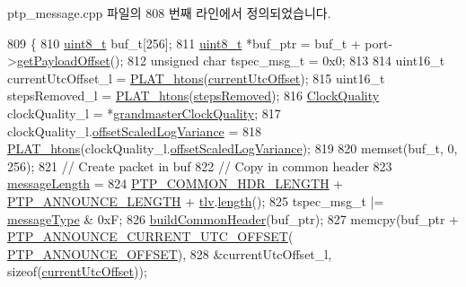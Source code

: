 ptp\+\_\+message.\+cpp 파일의 808 번째 라인에서 정의되었습니다.


\begin{DoxyCode}
809 \{
810     \hyperlink{stdint_8h_aba7bc1797add20fe3efdf37ced1182c5}{uint8\_t} buf\_t[256];
811     \hyperlink{stdint_8h_aba7bc1797add20fe3efdf37ced1182c5}{uint8\_t} *buf\_ptr = buf\_t + port->\hyperlink{class_common_port_a2697fd0fc7139659877b76cd1b022d44}{getPayloadOffset}();
812     \textcolor{keywordtype}{unsigned} \textcolor{keywordtype}{char} tspec\_msg\_t = 0x0;
813 
814     uint16\_t currentUtcOffset\_l = \hyperlink{linux_2src_2platform_8cpp_aa89fc0aa7465274c200da69771d2a043}{PLAT\_htons}(\hyperlink{class_p_t_p_message_announce_a4ee8eca04b1ccd7d8eaae5f0dd3a11fa}{currentUtcOffset});
815     uint16\_t stepsRemoved\_l = \hyperlink{linux_2src_2platform_8cpp_aa89fc0aa7465274c200da69771d2a043}{PLAT\_htons}(\hyperlink{class_p_t_p_message_announce_ab24df4cccbede4b07586878ef0d47395}{stepsRemoved});
816     \hyperlink{struct_clock_quality}{ClockQuality} clockQuality\_l = *\hyperlink{class_p_t_p_message_announce_aa67cf6cb88ed67b2850993312a7cd5f2}{grandmasterClockQuality};
817     clockQuality\_l.\hyperlink{struct_clock_quality_a7106813bdd70baa204ed0c71038fe3a0}{offsetScaledLogVariance} =
818         \hyperlink{linux_2src_2platform_8cpp_aa89fc0aa7465274c200da69771d2a043}{PLAT\_htons}(clockQuality\_l.\hyperlink{struct_clock_quality_a7106813bdd70baa204ed0c71038fe3a0}{offsetScaledLogVariance});
819 
820     memset(buf\_t, 0, 256);
821     \textcolor{comment}{// Create packet in buf}
822     \textcolor{comment}{// Copy in common header}
823     \hyperlink{class_p_t_p_message_common_a6c490faee54bca860c4d897aae50990f}{messageLength} =
824         \hyperlink{avbts__message_8hpp_a8ec4d965b7b1e83844f1c17f12e9b8e4}{PTP\_COMMON\_HDR\_LENGTH} + \hyperlink{avbts__message_8hpp_ad800b5cd5359d021054af8e902100ba7}{PTP\_ANNOUNCE\_LENGTH} + 
      \hyperlink{class_p_t_p_message_announce_ac7b185260086ad357ff7a9c29f468936}{tlv}.\hyperlink{class_path_trace_t_l_v_a3d0f4ae571310c6ed081daa3985ecb47}{length}();
825     tspec\_msg\_t |= \hyperlink{class_p_t_p_message_common_adb32627aa5b0e2dbad3ccd88aab07c05}{messageType} & 0xF;
826     \hyperlink{class_p_t_p_message_common_a66c6d7a38fc74d84b68e13216c82a4e6}{buildCommonHeader}(buf\_ptr);
827     memcpy(buf\_ptr + \hyperlink{avbts__message_8hpp_acd887e469bb001b97f8eef87a997ae59}{PTP\_ANNOUNCE\_CURRENT\_UTC\_OFFSET}(
      \hyperlink{avbts__message_8hpp_aaa3da4fa4e9e4cfe49477cd7f6b95bca}{PTP\_ANNOUNCE\_OFFSET}),
828            &currentUtcOffset\_l, \textcolor{keyword}{sizeof}(\hyperlink{class_p_t_p_message_announce_a4ee8eca04b1ccd7d8eaae5f0dd3a11fa}{currentUtcOffset}));

\end{DoxyCode}
